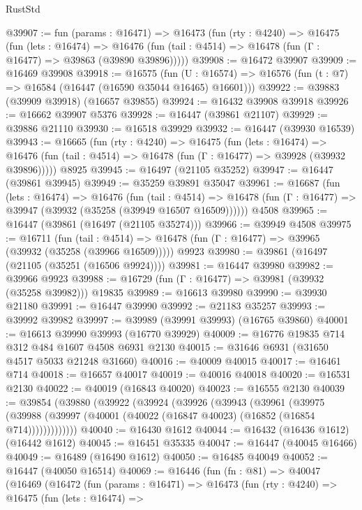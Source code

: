 \begin{lexlean}{RustStd}
\begin{coremodule}
{\begin{coremodule}
{{{{{{{{{{{{{{{{{{{{{{{{{{{{{{{{{{{{{{{{{{{{{{{{{{{{{{{@39907 := fun (params : @16471) =>
  @16473
    (fun (rty : @4240) =>
    @16475
      (fun (lets : @16474) =>
      @16476 (fun (tail : @4514) => @16478 (fun (Γ : @16477) => @39863 (@39890 @39896)))))
@39908 := @16472 @39907
@39909 := @16469 @39908
@39918 := @16575
    (fun (U : @16574) => @16576 (fun (t : @7) => @16584 (@16447 (@16590 @35044 @16465) @16601)))
@39922 := @39883 (@39909 @39918) (@16657 @39855)
@39924 := @16432 @39908 @39918
@39926 := @16662 @39907 @5376
@39928 := @16447 (@39861 @21107)
@39929 := @39886 @21110
@39930 := @16518 @39929
@39932 := @16447 (@39930 @16539)
@39943 := @16665
    (fun (rty : @4240) =>
    @16475
      (fun (lets : @16474) =>
      @16476 (fun (tail : @4514) => @16478 (fun (Γ : @16477) => @39928 (@39932 @39896)))))
    @8925
@39945 := @16497 (@21105 @35252)
@39947 := @16447 (@39861 @39945)
@39949 := @35259 @39891 @35047
@39961 := @16687
    (fun (lets : @16474) =>
    @16476
      (fun (tail : @4514) =>
      @16478 (fun (Γ : @16477) => @39947 (@39932 (@35258 (@39949 @16507 @16509))))))
    @4508
@39965 := @16447 (@39861 (@16497 (@21105 @35274)))
@39966 := @39949 @4508
@39975 := @16711
    (fun (tail : @4514) => @16478 (fun (Γ : @16477) => @39965 (@39932 (@35258 (@39966 @16509)))))
    @9923
@39980 := @39861 (@16497 (@21105 (@35251 (@16506 @9924))))
@39981 := @16447 @39980
@39982 := @39966 @9923
@39988 := @16729 (fun (Γ : @16477) => @39981 (@39932 (@35258 @39982))) @19835
@39989 := @16613 @39980
@39990 := @39930 @21180
@39991 := @16447 @39990
@39992 := @21183 @35257
@39993 := @39992 @39982
@39997 := @39989 (@39991 @39993) (@16765 @39860)
@40001 := @16613 @39990 @39993 (@16770 @39929)
@40009 := @16776 @19835 @714 @312 @484 @1607 @4508 @6931 @2130
@40015 := @31646 @6931 (@31650 @4517 @5033 @21248 @31660)
@40016 := @40009 @40015
@40017 := @16461 @714
@40018 := @16657 @40017
@40019 := @40016 @40018
@40020 := @16531 @2130
@40022 := @40019 (@16843 @40020)
@40023 := @16555 @2130
@40039 := @39854
    (@39880
      (@39922
        (@39924
          (@39926
            (@39943
              (@39961
                (@39975
                  (@39988 (@39997 (@40001 (@40022 (@16847 @40023) (@16852 (@16854 @714)))))))))))))
@40040 := @16430 @1612
@40044 := @16432 (@16436 @1612) (@16442 @1612)
@40045 := @16451 @35335
@40047 := @16447 (@40045 @16466)
@40049 := @16489 (@16490 @1612)
@40050 := @16485 @40049
@40052 := @16447 (@40050 @16514)
@40069 := @16446
    (fun (fn : @81) =>
    @40047
      (@16469
        (@16472
          (fun (params : @16471) =>
          @16473
            (fun (rty : @4240) =>
            @16475
              (fun (lets : @16474) =>
}}}}}}}}}}}}}}}}}}}}}}}}}}}}}}}}}}}}}}}}}}}}}}}}}}}}}}}
\end{coremodule}}
\end{coremodule}
\end{lexlean}
